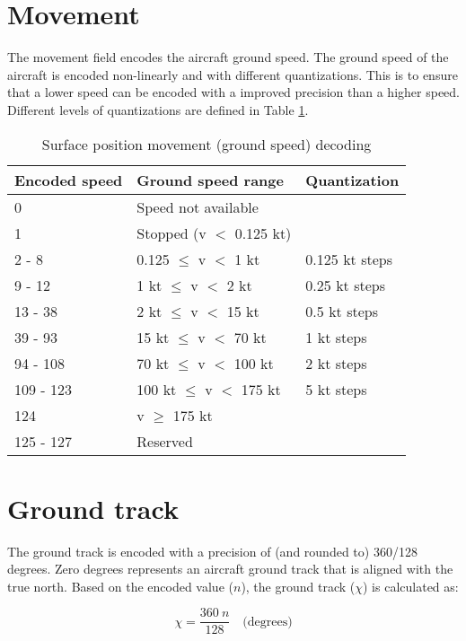 \section{Movement}

The movement field encodes the aircraft ground speed. The ground speed of the aircraft is encoded non-linearly and with different quantizations. This is to ensure that a lower speed can be encoded with a improved precision than a higher speed. Different levels of quantizations are defined in Table \ref{tb:adsb-surf-pos-mov}.

\begin{table}[ht]
\caption{Surface position movement (ground speed) decoding}
\label{tb:adsb-surf-pos-mov}
\begin{tabular}{|l|l|l|}
\hline
\textbf{Encoded speed} & \textbf{Ground speed range} & \textbf{Quantization} \\ \hline
0 & Speed not available &  \\ \hline
1 & Stopped (v $<$ 0.125 kt) &  \\ \hline
2 - 8 & 0.125 $\leq$ v $<$ 1 kt & 0.125 kt steps \\ \hline
9 - 12 & 1 kt $\leq$ v $<$ 2 kt & 0.25 kt steps \\ \hline
13 - 38 & 2 kt $\leq$ v $<$ 15 kt & 0.5 kt steps \\ \hline
39 - 93 & 15 kt $\leq$ v $<$ 70 kt & 1 kt steps \\ \hline
94 - 108 & 70 kt $\leq$ v $<$ 100 kt & 2 kt steps \\ \hline
109 - 123 & 100 kt $\leq$ v $<$ 175 kt & 5 kt steps \\ \hline
124 & v $\ge$ 175 kt &  \\ \hline
125 - 127 & Reserved &  \\ \hline
\end{tabular}
\end{table}


\section{Ground track}

The ground track is encoded with a precision of (and rounded to) 360/128 degrees. Zero degrees represents an aircraft ground track that is aligned with the true north. Based on the encoded value ($n$), the ground track ($\chi$) is calculated as:

\begin{equation}
    \chi = \frac{360~n}{128} \quad \text{(degrees)}
\end{equation}

